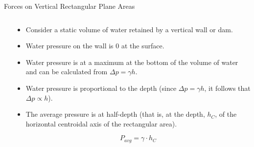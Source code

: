 \documentclass[9pt,xcolor={svgnames, x11names},professionalfonts, mathserif]{beamer}
\begin{document}
\begin{frame}{Forces on Vertical Rectangular Plane Areas}
 \begin{columns}
  \begin{column}[c]{0.38\textwidth}
  \end{column}
  \begin{column}[c]{0.58\textwidth}

   \begin{itemize}
    \item<1-5> Consider a static volume of water retained by a vertical wall or dam.
    \item<2-5> Water pressure on the wall is 0 at the surface.
    \item<3-5> Water pressure is at a maximum at the bottom of the volume of water
    and can be calculated from $\Delta p=\gamma h$.
    \item<4-5> Water pressure is proportional to the depth (since $\Delta p=\gamma h$,
    it follows that $\Delta p\propto h$).
    \item<5> The average pressure is at half-depth (that is, at the depth, $h_C$, of the horizontal centroidal axis of
    the rectangular area).
    \vspace{-0.25cm}

    \[	P_{avg}  =  \gamma\cdot h_C   \]



\end{itemize}
\end{column}
\end{columns}
\end{frame}
\end{document}
